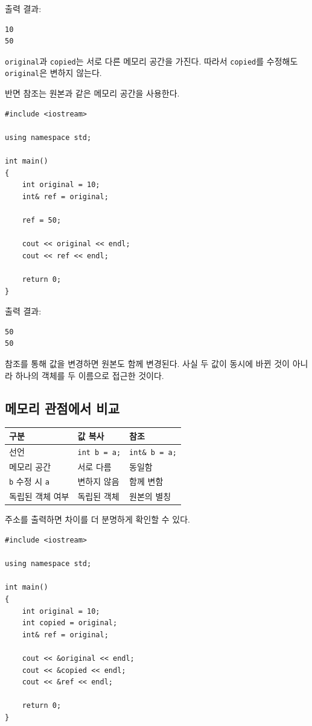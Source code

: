 \documentclass[11pt,a4paper]{article}
\begin{document}
출력 결과:

\begin{verbatim}
10
50
\end{verbatim}

\texttt{original}과 \texttt{copied}는 서로 다른 메모리 공간을 가진다.
따라서 \texttt{copied}를 수정해도 \texttt{original}은 변하지 않는다.

반면 참조는 원본과 같은 메모리 공간을 사용한다.

\begin{lstlisting}
#include <iostream>

using namespace std;

int main()
{
    int original = 10;
    int& ref = original;

    ref = 50;

    cout << original << endl;
    cout << ref << endl;

    return 0;
}
\end{lstlisting}

출력 결과:

\begin{verbatim}
50
50
\end{verbatim}

참조를 통해 값을 변경하면 원본도 함께 변경된다.
사실 두 값이 동시에 바뀐 것이 아니라 하나의 객체를 두 이름으로 접근한 것이다.

\subsection{메모리 관점에서 비교}

\begin{center}
\begin{tabular}{lll}
\toprule
구분 & 값 복사 & 참조 \\
\midrule
선언 & \texttt{int b = a;} & \texttt{int\& b = a;} \\
메모리 공간 & 서로 다름 & 동일함 \\
\texttt{b} 수정 시 \texttt{a} & 변하지 않음 & 함께 변함 \\
독립된 객체 여부 & 독립된 객체 & 원본의 별칭 \\
\bottomrule
\end{tabular}
\end{center}

주소를 출력하면 차이를 더 분명하게 확인할 수 있다.

\begin{lstlisting}
#include <iostream>

using namespace std;

int main()
{
    int original = 10;
    int copied = original;
    int& ref = original;

    cout << &original << endl;
    cout << &copied << endl;
    cout << &ref << endl;

    return 0;
}
\end{lstlisting}
\end{document}
